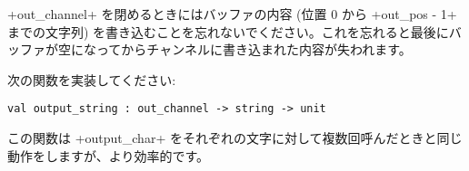 \ml+out_channel+ を閉めるときにはバッファの内容 (位置 0 から \ml+out_pos - 1+ までの文字列) を書き込むことを忘れないでください。これを忘れると最後にバッファが空になってからチャンネルに書き込まれた内容が失われます。

\begin{exercise}
次の関数を実装してください:
%
\begin{lstlisting}
val output_string : out_channel -> string -> unit
\end{lstlisting}
%
この関数は \ml+output_char+ をそれぞれの文字に対して複数回呼んだときと同じ動作をしますが、より効率的です。
\enlargethispage{2\baselineskip} %
\end{exercise}
